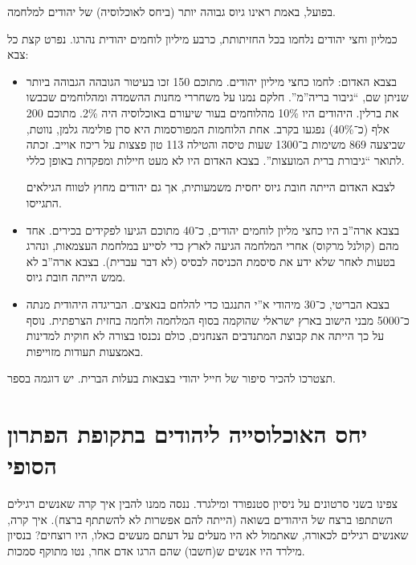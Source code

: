 \documentclass[]{article}
\begin{document}
	בפועל, באמת ראינו גיוס גבוהה יותר (ביחס לאוכלוסיה) של יהודים למלחמה. 
	
	כמליון וחצי יהודים נלחמו בכל החזיתותת, כרבע מיליון לוחמים יהודית נהרגו. נפרט קצת כל צבא: 
	\begin{itemize}
		\item בצבא האדום: לחמו כחצי מיליון יהודים. מתוכם 150 זכו בעיטור הגובהה הגבוהה ביותר שניתן שם, ``גיבור בריה''מ''. חלקם נמנו על משחררי מחנות ההשמדה ומהלוחמים שכבשו את ברלין. היהודים היו 10\% מהלוחמים בעור שיעורם באוכלוסיה היה 2\%. מתוכם 200 אלף (כ־40\%) נפגעו בקרב. אחת הלוחמות המפורסמות היא סרן פולימה גלמן, נווטת, שביצעה 869 משימות ב־1300 שעות טיסה והטילה 113 טון פצצות על ריכוז אוייב. זכתה לתואר ``גיבורת ברית המועצות''. בצבא האדום היו לא מעט חיילות ומפקדות באופן כללי. 
		
		לצבא האדום הייתה חובת גיוס יחסית משמעותית, אך גם יהודים מחוץ לטווח הגילאים התגייסו. 
		
		\item בצבא ארה''ב היו כחצי מליון לוחמים יהודים, כ־40 מתוכם הגיעו לפקידים בכירים. אחד מהם (קולנל מרקוס) אחרי המלחמה הגיעה לארץ כדי לסייע במלחמת העצמאות, ונהרג בטעות לאחר שלא ידע את סיסמת הכניסה לבסיס (לא דבר עברית). בצבא ארה''ב לא ממש הייתה חובת גיוס. 
		\item בצבא הבריטי, כ־30 מיהודי א''י התנגבו כדי להלחם בנאצים. הבריגדה היהודית מנתה כ־5000 מבני הישוב בארץ ישראלי שהוקמה בסוף המלחמה ולחמה בחזית הצרפתית. נוסף על כך הייתה את קבוצת המתנדבים הצנחנים, כולם נכנסו בצורה לא חוקית למדינות באמצעות תעודות מזוייפות. 
	\end{itemize}
	
	תצטרכו להכיר סיפור של חייל יהודי בצבאות בעלות הברית. יש דוגמה בספר. 
	
	\section{יחס האוכלוסייה ליהודים בתקופת הפתרון הסופי}
	צפינו בשני סרטונים על ניסיון סטנפורד ומילגרד. ננסה ממנו להבין איך קרה שאנשים רגילים השתתפו ברצח של היהודים בשואה (הייתה להם אפשרות לא להשתתף ברצח). איך קרה, שאנשים רגילים לכאורה, שאתמול לא היו מעלים על דעתם מעשים כאלו, היו רוצחים? בנסיון מילרד היו אנשים ש(חשבו) שהם הרגו אדם אחר, נטו מתוקף סמכות. 
	
\end{document}
